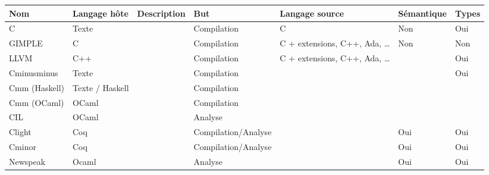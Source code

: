 \begin{tabular}{| l || l | l | l | l | l | l |}
\hline
Nom           & Langage hôte    & Description       & But                 & Langage source                   &  Sémantique & Types \\ \hline \hline
C             & Texte           & \cite{AnsiC}      & Compilation         & C                                &  Non        & Oui   \\ \hline
GIMPLE        & C               & \cite{gcc-gimple} & Compilation         & C + extensions, C++, Ada, \ldots &  Non        & Non   \\ \hline
LLVM          & C++             & \cite{llvm-pres}  & Compilation         & C + extensions, C++, Ada, \ldots &             & Oui   \\ \hline
Cminusminus   & Texte           & \cite{spjcmm}     & Compilation         &                                  &             & Oui   \\ \hline
Cmm (Haskell) & Texte / Haskell &                   & Compilation         &                                  &             &       \\ \hline
Cmm (OCaml)   & OCaml           &                   & Compilation         &                                  &             &       \\ \hline
CIL           & OCaml           & \cite{NeculaCil}  & Analyse             &                                  &             &       \\ \hline
Clight        & Coq             & \cite{cfront}     & Compilation/Analyse &                                  &  Oui        & Oui   \\ \hline
Cminor        & Coq             & \cite{cminorSL}   & Compilation/Analyse &                                  &  Oui        & Oui   \\ \hline
Newspeak      & Ocaml           & \cite{newspeak}   & Analyse             &                                  &  Oui        & Oui   \\ \hline
\end{tabular}

